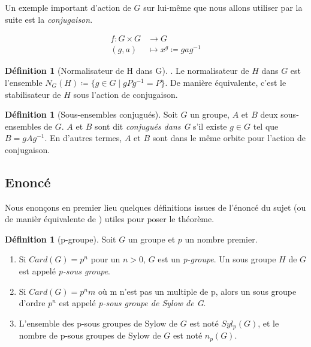 \documentclass[french]{article}
\theoremstyle{definition}
\newtheorem{definition}[subsubsection]{Définition}
\theoremstyle{plain}
\theoremstyle{plain}
\theoremstyle{plain}
\theoremstyle{plain}
\theoremstyle{plain}
\begin{document}
Un exemple important d'action de \( G \) sur lui-même que nous allons utiliser par la suite est la \textit{conjugaison}.


\begin{align*}
	f : G \times G &\to G \\
	(g,a) &\mapsto x^{g} \coloneq gag^{-1}
\end{align*}

\begin{definition}[Normalisateur de H dans G]\cite[p.~217]{chen2024napkin}.
	Le normalisateur de \( H \) dans \( G \) est l'ensemble 
	\( N_{G}({H}) \coloneq \{ g \in G \mid gPg^{-1} = P \} \).
	De manière équivalente, c'est le stabilisateur de \( H \) sous l'action de conjugaison.
\end{definition}

\begin{definition}[Sous-ensembles conjugués]\cite[p. ~??]{dummit2003abstract} 
	Soit \( G \) un groupe, \( A \) et \( B \) deux sous-ensembles de \( G \). 
	\( A \) et \( B \) sont dit 
	\textit{conjugués dans G} s'il existe \( g \in G \) tel que \( B = gAg^{-1} \).
	En d'autres termes, \( A \) et \( B \) sont dans le même orbite pour l'action de conjugaison.
\end{definition}


\subsection{Enoncé}

Nous enonçons en premier lieu quelques définitions issues de l'énoncé du sujet (ou de manièr équivalente de \cite[p. ~123 et 139]{dummit2003abstract}) utiles pour poser le théorème.

\begin{definition}[p-groupe]
	Soit \( G \) un groupe et \( p \) un nombre premier.
	\begin{enumerate}[label = (\roman*)]
	\item Si \( Card(G) = p^{n} \) pour un \( n > 0 \), \( G \) est un \textit{p-groupe}. Un sous groupe \( H \) de \( G \) est appelé \textit{p-sous groupe}.
	\item Si \( Card(G) = p^{n}m \) où m n'est pas un multiple de p, alors un sous groupe d'ordre \( p^{n} \) est appelé \textit{p-sous groupe de Sylow de G}.
	\item L'ensemble des p-sous groupes de Sylow de \( G \) est noté \( Syl_{p}(G) \), et le nombre de p-sous groupes de Sylow de \( G \) est noté \( n_{p}(G) \).
	\end{enumerate}
\end{definition}
\end{document}
